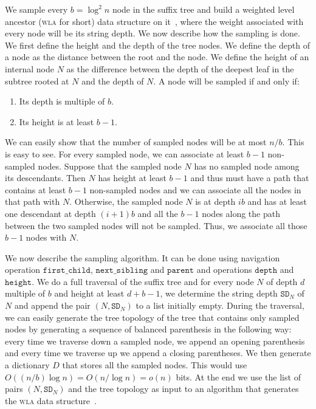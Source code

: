 \documentclass[a4paper]{article}
\begin{document}
We sample every $b=\log^2n$ node in the suffix tree and build a weighted level ancestor (\textsc{wla} for short) data structure  on it~\cite{FM96}, where the weight associated with every node will be its string depth. 
We now describe how the sampling is done. We first define the height and the depth of the tree nodes. We define the depth
of a node as the distance between the root and the node. We define the height of an internal node $N$ as the difference between the depth of the deepest leaf in the subtree rooted at $N$ and the depth of $N$. 
A node will be sampled if and  only if:
\begin{enumerate}
\item Its depth is multiple of $b$. 
\item Its height is at least $b-1$. 
\end{enumerate}
We can easily show that the number of sampled nodes will be at most $n/b$. This is easy to see. For every sampled node, we can associate at least $b-1$ non-sampled nodes. Suppose that the sampled node $N$ has no sampled node among its descendants. Then $N$ has height at least $b-1$ and thus must have a path that contains at least $b-1$ non-sampled nodes and we can associate all the nodes in that path with $N$. Otherwise, the sampled node $N$ is at depth $ib$ and has at least one descendant at depth $(i+1)b$ and all the $b-1$ nodes along the path between the two sampled nodes will not be sampled. Thus, we associate all those $b-1$ nodes with $N$. 

We now describe the sampling algorithm. It can be done using navigation operation $\mathtt{first\_child}$, $\mathtt{next\_sibling}$ and $\mathtt{parent}$ and operations $\mathtt{depth}$ and $\mathtt{height}$. We do a full traversal of the suffix tree and for every node $N$ of depth $d$ multiple of $b$ and height at least $d+b-1$, we determine the string depth $\mathtt{SD}_N$ of $N$ and append the pair $(N,\mathtt{SD}_N)$ to a list initially empty. During the traversal, we can easily generate the tree topology of the tree that contains only sampled nodes by generating a sequence of balanced parenthesis in the following way:
every time we traverse down a sampled node, we append an opening parenthesis and every time we traverse up we append a closing parentheses. We then generate a dictionary $D$ that stores all the sampled nodes. This would use $O((n/b)\log n)=O(n/\log n)=o(n)$ bits. 
At the end we use the list of pairs $(N,\mathtt{SD}_N)$ and the tree topology as input to an algorithm that generates the \textsc{wla} data structure~\cite{FM96}. 
\end{document}
